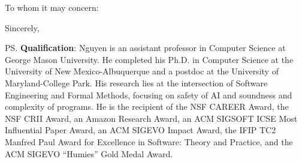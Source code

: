 \documentclass[11pt]{letter}
\begin{document}
\begin{letter}{}

  \date{\textbf{\today}}
  \opening{To whom it may concern:}

  \lipsum[2-8]

  \closing{Sincerely,}


  \ps{\textbf{Qualification}: Nguyen is an assistant professor in Computer Science at George Mason University. He completed his Ph.D. in Computer Science at the University of New Mexico-Albuquerque and a postdoc at the University of Maryland-College Park. His research lies at the intersection of Software Engineering and Formal Methods, focusing on safety of AI and soundness and complexity of programs. He is the recipient of the NSF CAREER Award, the NSF CRII Award, an Amazon Research Award, an ACM SIGSOFT ICSE Most Influential Paper Award, an ACM SIGEVO Impact Award, the IFIP TC2 Manfred Paul Award for Excellence in Software: Theory and Practice, and the ACM SIGEVO ``Humies'' Gold Medal Award.}
\end{letter}
\end{document}
